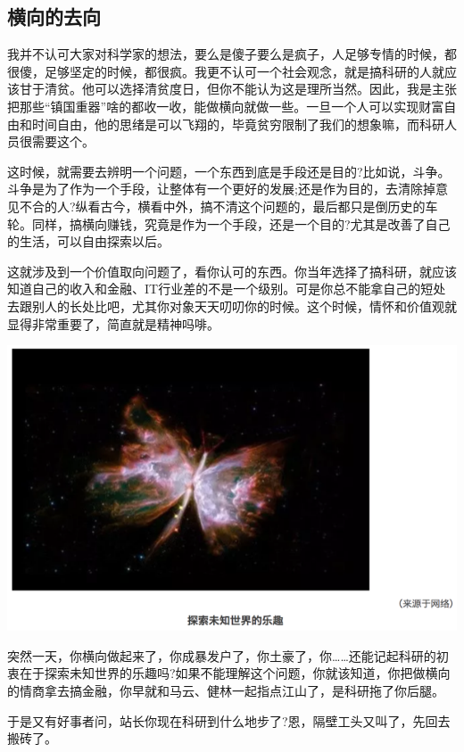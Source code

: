 \documentclass[
]{book}
\begin{document}
\hypertarget{ux6a2aux5411ux7684ux53bbux5411}{%
\subsection{横向的去向}\label{ux6a2aux5411ux7684ux53bbux5411}}

我并不认可大家对科学家的想法，要么是傻子要么是疯子，人足够专情的时候，都很傻，足够坚定的时候，都很疯。我更不认可一个社会观念，就是搞科研的人就应该甘于清贫。他可以选择清贫度日，但你不能认为这是理所当然。因此，我是主张把那些``镇国重器''啥的都收一收，能做横向就做一些。一旦一个人可以实现财富自由和时间自由，他的思绪是可以飞翔的，毕竟贫穷限制了我们的想象嘛，而科研人员很需要这个。

这时候，就需要去辨明一个问题，一个东西到底是手段还是目的?比如说，斗争。斗争是为了作为一个手段，让整体有一个更好的发展;还是作为目的，去清除掉意见不合的人?纵看古今，横看中外，搞不清这个问题的，最后都只是倒历史的车轮。同样，搞横向赚钱，究竟是作为一个手段，还是一个目的?尤其是改善了自己的生活，可以自由探索以后。

这就涉及到一个价值取向问题了，看你认可的东西。你当年选择了搞科研，就应该知道自己的收入和金融、IT行业差的不是一个级别。可是你总不能拿自己的短处去跟别人的长处比吧，尤其你对象天天叨叨你的时候。这个时候，情怀和价值观就显得非常重要了，简直就是精神吗啡。

\includegraphics[width=8.33in]{images/kq3}

突然一天，你横向做起来了，你成暴发户了，你土豪了，你\ldots\ldots 还能记起科研的初衷在于探索未知世界的乐趣吗?如果不能理解这个问题，你就该知道，你把做横向的情商拿去搞金融，你早就和马云、健林一起指点江山了，是科研拖了你后腿。

于是又有好事者问，站长你现在科研到什么地步了?恩，隔壁工头又叫了，先回去搬砖了。
\end{document}
